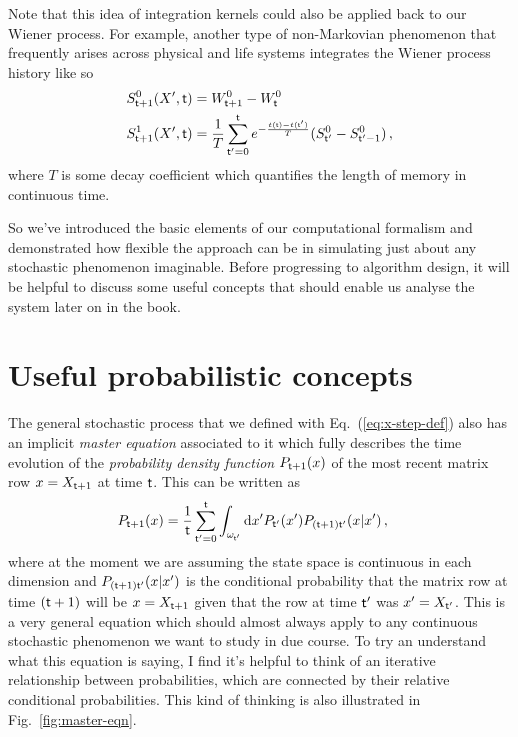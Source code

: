 \documentclass{book}
\begin{document}
Note that this idea of integration kernels could also be applied back to our Wiener process. For example, another type of non-Markovian phenomenon that frequently arises across physical and life systems integrates the Wiener process history like so
\begin{align}
S^{0}_{{\sf t}+1}(X',{\sf t}) &= W^0_{{\sf t}+1}-W^0_{\sf t}\\
S^{1}_{{\sf t}+1}(X',{\sf t}) &= \frac{1}{T}\sum^{{\sf t}}_{{\sf t}'=0}e^{-\frac{t({\sf t})-t({\sf t}')}{T}} (S^{0}_{{\sf t}'}-S^{0}_{{\sf t}'-1}) \,,
\end{align}
where $T$ is some decay coefficient which quantifies the length of memory in continuous time.

So we've introduced the basic elements of our computational formalism and demonstrated how flexible the approach can be in simulating just about any stochastic phenomenon imaginable. Before progressing to algorithm design, it will be helpful to discuss some useful concepts that should enable us analyse the system later on in the book.

\section{\sffamily Useful probabilistic concepts}

The general stochastic process that we defined with Eq.~(\ref{eq:x-step-def}) also has an implicit \emph{master equation} associated to it which fully describes the time evolution of the \emph{probability density function} $P_{{\sf t}+1}(x)$ of the most recent matrix row $x=X_{{\sf t}+1}$ at time ${\sf t}$. This can be written as
\begin{align}
P_{{\sf t}+1}(x) &= \frac{1}{{\sf t}}\sum_{{\sf t}'=0}^{{\sf t}}\int_{\omega_{{\sf t}'}}{\rm d}x' P_{{\sf t}'}(x') P_{({\sf t}+1){\sf t}'}(x\vert x') \label{eq:master-x-cont} \,,
\end{align}
where at the moment we are assuming the state space is continuous in each dimension and $P_{({\sf t}+1){\sf t}'}(x\vert x')$ is the conditional probability that the matrix row at time $({\sf t}+1)$ will be $x=X_{{\sf t}+1}$ given that the row at time ${\sf t}'$ was $x'=X_{{\sf t}'}$. This is a very general equation which should almost always apply to any continuous stochastic phenomenon we want to study in due course. To try an understand what this equation is saying, I find it's helpful to think of an iterative relationship between probabilities, which are connected by their relative conditional probabilities. This kind of thinking is also illustrated in Fig.~\ref{fig:master-eqn}.
\end{document}
